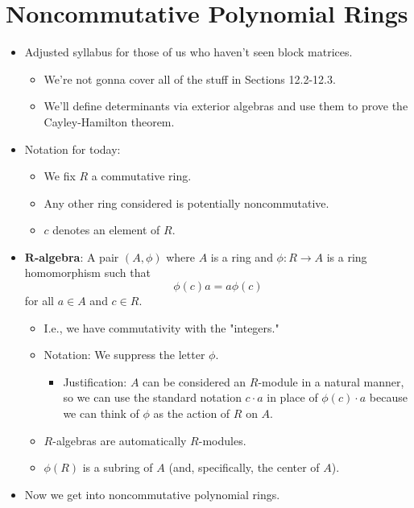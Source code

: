 \documentclass[../notes.tex]{subfiles}
\begin{document}
\section{Noncommutative Polynomial Rings}
\begin{itemize}
    \item {}Adjusted syllabus for those of us who haven't seen block matrices.
    \begin{itemize}
        \item We're not gonna cover all of the stuff in Sections 12.2-12.3.
        \item We'll define determinants via exterior algebras and use them to prove the Cayley-Hamilton theorem.
    \end{itemize}
    \item Notation for today:
    \begin{itemize}
        \item We fix $R$ a commutative ring.
        \item Any other ring considered is potentially noncommutative.
        \item $c$ denotes an element of $R$.
    \end{itemize}
    \item \textbf{$\bm{R}$-algebra}: A pair $(A,\phi)$ where $A$ is a ring and $\phi:R\to A$ is a ring homomorphism such that
    \begin{equation*}
        \phi(c)a = a\phi(c)
    \end{equation*}
    for all $a\in A$ and $c\in R$.
    \begin{itemize}
        \item I.e., we have commutativity with the "integers."
        \item Notation: We suppress the letter $\phi$.
        \begin{itemize}
            \item Justification: $A$ can be considered an $R$-module in a natural manner, so we can use the standard notation $c\cdot a$ in place of $\phi(c)\cdot a$ because we can think of $\phi$ as the action of $R$ on $A$.
        \end{itemize}
        \item $R$-algebras are automatically $R$-modules.
        \item $\phi(R)$ is a subring of $A$ (and, specifically, the center of $A$).
    \end{itemize}
    \item Now we get into noncommutative polynomial rings.

\end{itemize}
\end{document}
